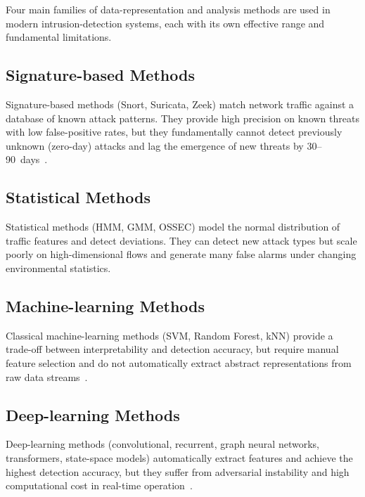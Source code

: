 \label{sec:data_representation_methods}

Four main families of data-representation and analysis methods are used in
modern intrusion-detection systems, each with its own effective range and
fundamental limitations.

\subsection{Signature-based Methods}

Signature-based methods (Snort, Suricata, Zeek) match network traffic against
a database of known attack patterns. They provide high precision on known
threats with low false-positive rates, but they fundamentally cannot detect
previously unknown (zero-day) attacks and lag the emergence of new threats
by 30--90~days~\cite{Roesch1999,Paxson1999}.

\subsection{Statistical Methods}

Statistical methods (HMM, GMM, OSSEC) model the normal distribution of
traffic features and detect deviations. They can detect new attack types
but scale poorly on high-dimensional flows and generate many false alarms
under changing environmental statistics.

\subsection{Machine-learning Methods}

Classical machine-learning methods (SVM, Random Forest, kNN) provide a
trade-off between interpretability and detection accuracy, but require
manual feature selection and do not automatically extract abstract
representations from raw data streams~\cite{Buczak2016}.

\subsection{Deep-learning Methods}

Deep-learning methods (convolutional, recurrent, graph neural networks,
transformers, state-space models) automatically extract features and
achieve the highest detection accuracy, but they suffer from adversarial
instability and high computational cost in real-time
operation~\cite{Ahmad2021,Ferrag2020}.

